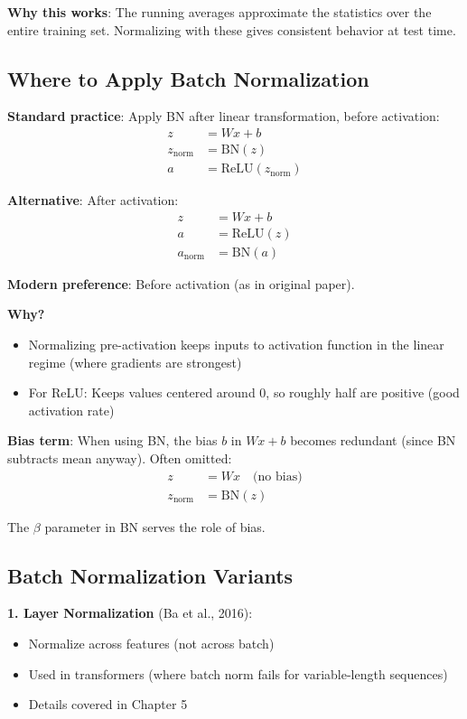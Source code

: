 \documentclass[11pt,oneside]{book}
\begin{document}
\textbf{Why this works}: The running averages approximate the statistics over the entire training set. Normalizing with these gives consistent behavior at test time.

\subsection{Where to Apply Batch Normalization}

\textbf{Standard practice}: Apply BN after linear transformation, before activation:
\begin{align*}
z &= Wx + b \\
z_{\text{norm}} &= \text{BN}(z) \\
a &= \text{ReLU}(z_{\text{norm}})
\end{align*}

\textbf{Alternative}: After activation:
\begin{align*}
z &= Wx + b \\
a &= \text{ReLU}(z) \\
a_{\text{norm}} &= \text{BN}(a)
\end{align*}

\textbf{Modern preference}: Before activation (as in original paper).

\textbf{Why?}
\begin{itemize}
\item Normalizing pre-activation keeps inputs to activation function in the linear regime (where gradients are strongest)
\item For ReLU: Keeps values centered around 0, so roughly half are positive (good activation rate)
\end{itemize}

\textbf{Bias term}: When using BN, the bias $b$ in $Wx + b$ becomes redundant (since BN subtracts mean anyway). Often omitted:
\begin{align*}
z &= Wx \quad \text{(no bias)} \\
z_{\text{norm}} &= \text{BN}(z)
\end{align*}

The $\beta$ parameter in BN serves the role of bias.

\subsection{Batch Normalization Variants}

\textbf{1. Layer Normalization} (Ba et al., 2016):
\begin{itemize}
\item Normalize across features (not across batch)
\item Used in transformers (where batch norm fails for variable-length sequences)
\item Details covered in Chapter 5
\end{itemize}
\end{document}

